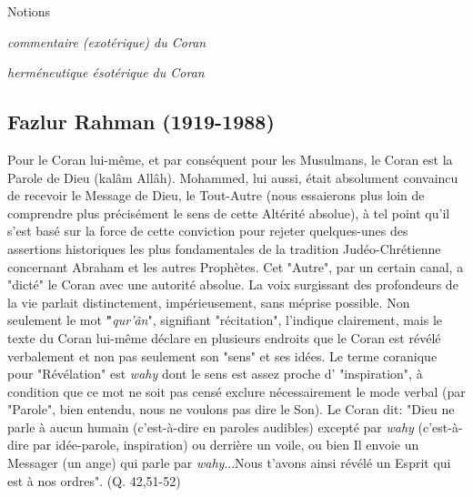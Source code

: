 {Notions}
\begin{Def}[tafsir]
\emph{commentaire (exotérique) du Coran}
\end{Def}


\begin{Def}[ta'wil]
\emph{herméneutique ésotérique du Coran}
\end{Def}
 

\subsection{Fazlur Rahman
(1919-1988)}

 
Pour le Coran lui-même, et par conséquent pour les Musulmans, le Coran
est la Parole de Dieu (kalâm Allâh). Mohammed, lui aussi, était
absolument convaincu de recevoir le Message de Dieu, le Tout-Autre (nous
essaierons plus loin de comprendre plus précisément le sens de cette
Altérité absolue), à tel point qu'il s'est basé sur la force de cette
conviction pour rejeter quelques-unes des assertions historiques les
plus fondamentales de la tradition Judéo-Chrétienne concernant Abraham
et les autres Prophètes. Cet "Autre", par un certain canal, a "dicté" le
Coran avec une autorité absolue. La voix surgissant des profondeurs de
la vie parlait distinctement, impérieusement, sans méprise possible. Non
seulement le mot \textbf{"}\emph{qur'ân}", signifiant "récitation",
l'indique clairement, mais le texte du Coran lui-même déclare en
plusieurs endroits que le Coran est révélé verbalement et non pas
seulement son "sens" et ses idées. Le terme coranique pour "Révélation"
est \emph{wahy} dont le sens est assez proche d' "inspiration", à
condition que ce mot ne soit pas censé exclure nécessairement le mode
verbal (par "Parole", bien entendu, nous ne voulons pas dire le Son). Le
Coran dit: "Dieu ne parle à aucun humain (c'est-à-dire en paroles
audibles) excepté par \emph{wahy} (c'est-à-dire par idée-parole,
inspiration) ou derrière un voile, ou bien Il envoie un Messager (un
ange) qui parle par \emph{wahy}...Nous t'avons ainsi révélé un Esprit
qui est à nos ordres". (Q. 42,51-52)


